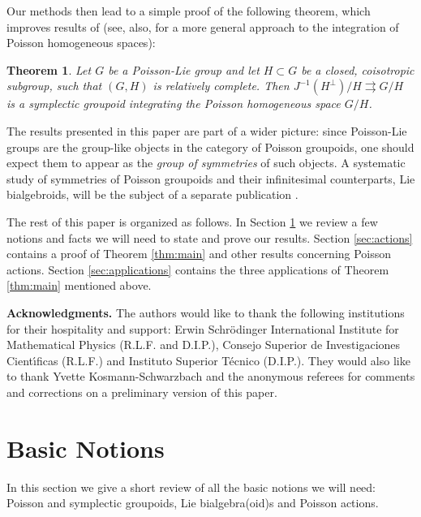 \documentclass[a4paper,11pt]{amsart}
\newtheorem{thmz}{Theorem}
\theoremstyle{definition}
\theoremstyle{remark}
\begin{document}
Our methods then lead to a simple proof of the following theorem, which improves results of
\cite{BCST} (see, also, \cite{Lu3} for a more general approach to
the integration of Poisson homogeneous spaces):

\begin{thmz}
Let $G$ be a Poisson-Lie group and let $H\subset G$ be a
closed, coisotropic subgroup, such that $(G,H)$ is relatively complete.
Then $J^{-1}(H^\perp )/H{\rightrightarrows} G/H$ is a symplectic groupoid integrating the Poisson homogeneous space $G/H$.
\end{thmz}

The results presented in this paper are part of a wider picture: since Poisson-Lie
groups are the group-like objects in the category of Poisson
groupoids, one should expect them to appear as the \emph{group
of symmetries} of such objects. A systematic study of
symmetries of Poisson groupoids and their infinitesimal
counterparts, Lie bialgebroids, will be the subject of a separate publication
\cite{FP}.

The rest of this paper is organized as follows. In Section \ref{sec:background} we review a few notions and
facts we will need to state and prove our results. Section \ref{sec:actions} contains a proof of Theorem
\ref{thm:main} and other results concerning Poisson actions. Section \ref{sec:applications} contains the three
applications of Theorem \ref{thm:main} mentioned above.

\vskip 10pt \noindent \textbf{Acknowledgments.} The authors would like to thank the following institutions for
their hospitality and support: Erwin Schr\"odinger International Institute for Mathematical Physics (R.L.F. and
D.I.P.), Consejo Superior de Investigaciones Cient\'{\i}ficas (R.L.F.) and Instituto Superior T\'{e}cnico
(D.I.P.). They would also like to thank Yvette Kosmann-Schwarzbach and the anonymous referees for comments and
corrections on a preliminary version of this paper.

\section{Basic Notions}            \label{sec:background}             
In this section we give a short review of all the basic notions we
will need: Poisson and symplectic groupoids, Lie bialgebra(oid)s
and Poisson actions.
\end{document}
